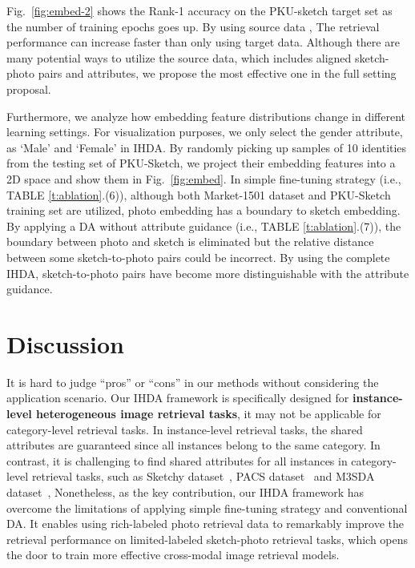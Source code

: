 \documentclass[journal]{IEEEtran}
\begin{document}
Fig.~\ref{fig:embed-2} shows the Rank-1 accuracy on the PKU-sketch target set as the number of training epochs goes up. By using source data , The retrieval performance can increase faster than only using target data. Although there are many potential ways to utilize the source data, which includes aligned sketch-photo pairs and attributes, we propose the most effective one in the full setting proposal.

Furthermore, we analyze how embedding feature distributions change in different learning settings. For visualization purposes, we only select the gender attribute, as `Male' and `Female' in IHDA. By randomly picking up samples of 10 identities from the testing set of PKU-Sketch, we project their embedding features into a 2D space and show them in Fig.~\ref{fig:embed}. In simple fine-tuning strategy (i.e., TABLE \ref{t:ablation}.(6)), although both Market-1501 dataset and PKU-Sketch training set are utilized, photo embedding has a boundary to sketch embedding. By applying a DA without attribute guidance (i.e., TABLE \ref{t:ablation}.(7)), the boundary between photo and sketch is eliminated but the relative distance between some sketch-to-photo pairs could be incorrect. By using the complete IHDA, sketch-to-photo pairs have become more distinguishable with the attribute guidance.


\section{Discussion}
\label{sec:discusssion}


It is hard to judge ``pros'' or ``cons'' in our methods without considering the application scenario. 
Our IHDA framework is specifically designed for \textbf{instance-level heterogeneous image retrieval tasks}, it may not be applicable for category-level retrieval tasks. In instance-level retrieval tasks, the shared attributes are guaranteed since all instances belong to the same category. In contrast, it is challenging to find shared attributes for all instances in category-level retrieval tasks, such as Sketchy dataset~\cite{sangkloy2016sketchy}, PACS dataset~\cite{Li2017dg} and M3SDA dataset~\cite{peng2019moment},
Nonetheless, as the key contribution, our IHDA framework has overcome the limitations of applying simple fine-tuning strategy and conventional DA. It enables using rich-labeled photo retrieval data to remarkably improve the retrieval performance on limited-labeled sketch-photo retrieval tasks, which opens the door to train more effective cross-modal image retrieval models.
\end{document}
